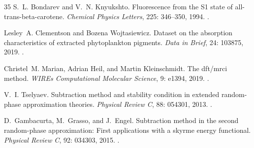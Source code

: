 \documentclass[11pt,a4paper]{article}
\begin{document}
\begin{thebibliography}{35}
S.~L. Bondarev and V.~N. Knyukshto.
\newblock Fluorescence from the {S1} state of all-trans-beta-carotene.
\newblock \emph{Chemical Physics Letters}, 225: 346--350, 1994.
\newblock {}.

Lesley~A. Clementson and Bozena Wojtasiewicz.
\newblock Dataset on the absorption characteristics of extracted phytoplankton
  pigments.
\newblock \emph{Data in Brief}, 24: 103875, 2019.
\newblock {}.

Christel~M. Marian, Adrian Heil, and Martin Kleinschmidt.
\newblock The dft/mrci method.
\newblock \emph{WIREs Computational Molecular Science}, 9: e1394,
  2019.
\newblock {}.

V.~I. Tselyaev.
\newblock Subtraction method and stability condition in extended random-phase
  approximation theories.
\newblock \emph{Physical Review C}, 88: 054301, 2013.
\newblock {}.

D.~Gambacurta, M.~Grasso, and J.~Engel.
\newblock Subtraction method in the second random-phase approximation: First
  applications with a skyrme energy functional.
\newblock \emph{Physical Review C}, 92: 034303, 2015.
\newblock {}.

\end{thebibliography}
\end{document}
